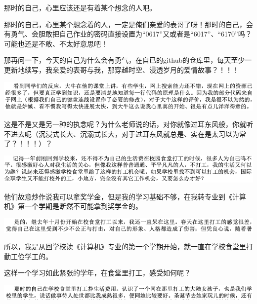 \documentclass[9pt, b5paper]{article}
\begin{document}
那时的自己，心里应该还是有着某个想念的人吧。

那时的自己，心里某个想念着的人，一定是俺们亲爱的表哥了呀！那时的自己，会有勇气、会胆敢把自己作业的密码直接设置为“0617”又或者是“6017”、“6170”吗？可能也还是不敢、不太好意思吧！

那再问一下，今天的自己为什么会有勇气，在自已的github的仓库里，每天至少一更新地续写，我亲爱的表哥与我，那穿越时空、浸透岁月的爱情故事？！！！

\begin{center}
\includegraphics[width=.9\linewidth]{./pic/backups_plans_20210424_214908.png}
\end{center}

这是不是又是另一种的执念呢？为什么老师说的话，对你就像过耳东风般，你就听不进去呢（沉浸式长大、沉溺式长大，对于过耳东风就总是、实在是太习以为常了？！！！）？

\begin{center}
\includegraphics[width=.9\linewidth]{./pic/backups_plans_20210424_220444.png}
\end{center}

他们故意炒作说我可以拿奖学金，但是我的学习基础不够，在我转专业到《计算机》第一个学期是断然不可能拿到奖学金的。

\begin{center}
\includegraphics[width=.9\linewidth]{./pic/backups_plans_20210424_220650.png}
\end{center}

所以，我是从回学校读《计算机》专业的第一个学期开始，就一直在学校食堂里打勤工俭学工的。 

这样一个学习如此紧张的学年，在食堂里打工，感受如何呢？

\begin{center}
\includegraphics[width=.9\linewidth]{./pic/backups_plans_20210502_153908.png}
\end{center}
\end{document}
